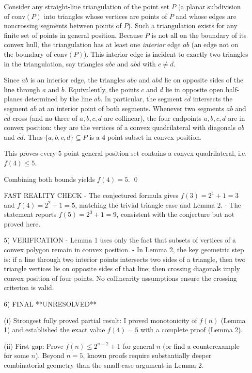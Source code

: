 Consider any straight-line triangulation of the point set $P$ (a planar subdivision of $\mathrm{conv}(P)$ into triangles whose vertices are points of $P$ and whose edges are noncrossing segments between points of $P$).
Such a triangulation exists for any finite set of points in general position.
Because $P$ is not all on the boundary of its convex hull, the triangulation has at least one \emph{interior} edge $ab$ (an edge not on the boundary of $\mathrm{conv}(P)$).
This interior edge is incident to exactly two triangles in the triangulation, say triangles $abc$ and $abd$ with $c\ne d$.

Since $ab$ is an interior edge, the triangles $abc$ and $abd$ lie on opposite sides of the line through $a$ and $b$.
Equivalently, the points $c$ and $d$ lie in opposite open half-planes determined by the line $ab$.
In particular, the segment $\overline{cd}$ intersects the segment $\overline{ab}$ at an interior point of both segments.
Whenever two segments $\overline{ab}$ and $\overline{cd}$ cross (and no three of $a,b,c,d$ are collinear), the four endpoints $a,b,c,d$ are in convex position: they are the vertices of a convex quadrilateral with diagonals $\overline{ab}$ and $\overline{cd}$.
Thus $\{a,b,c,d\}\subseteq P$ is a 4-point subset in convex position.

This proves every $5$-point general-position set contains a convex quadrilateral, i.e. $f(4)\le 5$.

Combining both bounds yields $f(4)=5$. \qed

FAST REALITY CHECK
- The conjectured formula gives $f(3)=2^{1}+1=3$ and $f(4)=2^{2}+1=5$, matching the trivial triangle case and Lemma 2.
- The statement reports $f(5)=2^{3}+1=9$, consistent with the conjecture but not proved here.

5) VERIFICATION
- Lemma 1 uses only the fact that subsets of vertices of a convex polygon remain in convex position.
- In Lemma 2, the key geometric step is: if a line through two interior points intersects two sides of a triangle, then two triangle vertices lie on opposite sides of that line; then crossing diagonals imply convex position of four points. No collinearity assumptions ensure the crossing criterion is valid.

6) FINAL
**UNRESOLVED**

(i) Strongest fully proved partial result:
I proved monotonicity of $f(n)$ (Lemma 1) and established the exact value $f(4)=5$ with a complete proof (Lemma 2).

(ii) First gap:
Prove $f(n)\le 2^{n-2}+1$ for general $n$ (or find a counterexample for some $n$).
Beyond $n=5$, known proofs require substantially deeper combinatorial geometry than the small-case argument in Lemma 2.

